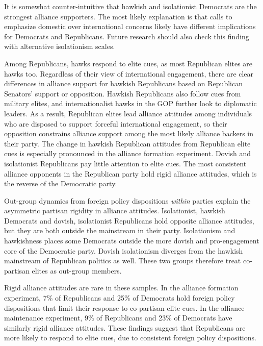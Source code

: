 \documentclass[12pt]{article}
\begin{document}
It is somewhat counter-intuitive that hawkish and isolationist Democrats are the strongest alliance supporters. 
The most likely explanation is that calls to emphasize domestic over international concerns likely have different implications for Democrats and Republicans.
Future research should also check this finding with alternative isolationism scales. 


Among Republicans, hawks respond to elite cues, as most Republican elites are hawks too. 
Regardless of their view of international engagement, there are clear differences in alliance support for hawkish Republicans based on Republican Senators' support or opposition.
Hawkish Republicans also follow cues from military elites, and internationalist hawks in the GOP further look to diplomatic leaders. 
As a result, Republican elites lead alliance attitudes among individuals who are disposed to support forceful international engagement, so their opposition constrains alliance support among the most likely alliance backers in their party. 
The change in hawkish Republican attitudes from Republican elite cues is especially pronounced in the alliance formation experiment. 
Dovish and isolationist Republicans pay little attention to elite cues. 
The most consistent alliance opponents in the Republican party hold rigid alliance attitudes, which is the reverse of the Democratic party. 


Out-group dynamics from foreign policy dispositions \textit{within} parties explain the asymmetric partisan rigidity in alliance attitudes. 
Isolationist, hawkish Democrats and dovish, isolationist Republicans hold opposite alliance attitudes, but they are both outside the mainstream in their party.
Isolationism and hawkishness places some Democrats outside the more dovish and pro-engagement core of the Democratic party. 
Dovish isolationism diverges from the hawkish mainstream of Republican politics as well. 
These two groups therefore treat co-partisan elites as out-group members.  


Rigid alliance attitudes are rare in these samples.
In the alliance formation experiment, 7\% of Republicans and 25\% of Democrats hold foreign policy dispositions that limit their response to co-partisan elite cues. 
In the alliance maintenance experiment, 9\% of Republicans and 23\% of Democrats have similarly rigid alliance attitudes.
These findings suggest that Republicans are more likely to respond to elite cues, due to consistent foreign policy dispositions.
\end{document}
